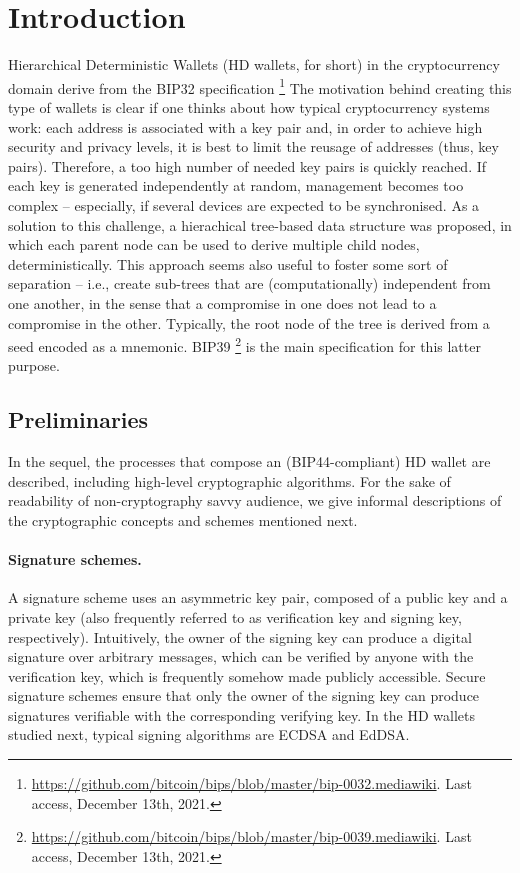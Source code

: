 \section{Introduction}
\label{sec:introduction}

Hierarchical Deterministic Wallets (HD wallets, for short) in the cryptocurrency
domain derive from the BIP32 specification%
\footnote{\url{https://github.com/bitcoin/bips/blob/master/bip-0032.mediawiki}.
  Last access, December 13th, 2021.}
The motivation behind creating this type of wallets is clear if one thinks about
how typical cryptocurrency systems work: each address is associated with a key
pair and, in order to achieve high security and privacy levels, it is best to
limit the reusage of addresses (thus, key pairs). Therefore, a too high number
of needed key pairs is quickly reached. If each key is generated independently
at random, management becomes too complex -- especially, if several devices
are expected to be synchronised. As a solution to this challenge, a hierachical
tree-based data structure was proposed, in which each parent node can be used to
derive multiple child nodes, deterministically. This approach seems also useful
to foster some sort of separation -- i.e., create sub-trees that are
(computationally) independent from one another, in the sense that a compromise
in one does not lead to a compromise in the other. Typically, the root node
of the tree is derived from a seed encoded as a mnemonic. BIP39%
\footnote{\url{https://github.com/bitcoin/bips/blob/master/bip-0039.mediawiki}.
  Last access, December 13th, 2021.} is the main specification for this latter
purpose.

\subsection{Preliminaries}

In the sequel, the processes that compose an (BIP44-compliant) HD wallet are
described, including high-level cryptographic algorithms. For the sake of
readability of non-cryptography savvy audience, we give informal descriptions of
the cryptographic concepts and schemes mentioned next.

\paragraph{Signature schemes.} A signature scheme uses an asymmetric key pair,
composed of a public key and a private key (also frequently referred to as
verification key and signing key, respectively). Intuitively, the owner of the
signing key can produce a digital signature over arbitrary messages, which can
be verified by anyone with the verification key, which is frequently somehow
made publicly accessible. Secure signature schemes ensure that only the owner
of the signing key can produce signatures verifiable with the corresponding
verifying key. In the HD wallets studied next, typical signing algorithms are
ECDSA and EdDSA.


